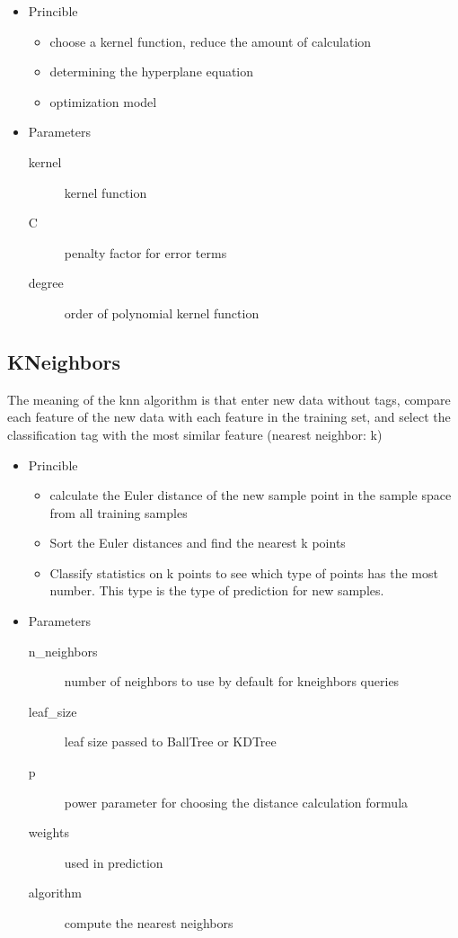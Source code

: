 \begin{itemize}
	\item Princible
	
	\begin{itemize}
		\item choose a kernel function, reduce the amount of calculation
		\item determining the hyperplane equation
		\item optimization model
	\end{itemize}

	\item Parameters
	
	\begin{description}
		\item[kernel] kernel function
		\item[C] penalty factor for error terms
		\item[degree] order of polynomial kernel function
	\end{description}
	
\end{itemize}

\subsection{KNeighbors}

The meaning of the knn algorithm is that 
enter new data without tags, 
compare each feature of the new data with 
each feature in the training set, 
and select the classification tag with 
the most similar feature (nearest neighbor: k)

\begin{itemize}
	\item Princible
	\begin{itemize}
		\item calculate the Euler distance of 
		the new sample point in the sample space 
		from all training samples
		\item Sort the Euler distances and 
		find the nearest k points
		\item Classify statistics on k points to 
		see which type of points has 
		the most number. 
		This type is the type of 
		prediction for new samples.
	\end{itemize}
	
	\item Parameters
	\begin{description}
		\item[n_neighbors] number of neighbors to use 
		by default for kneighbors queries
		\item[leaf_size] leaf size passed to BallTree or KDTree
		\item[p] power parameter for choosing 
		the distance calculation formula
		\item[weights] used in prediction
		\item[algorithm] compute the nearest neighbors
	\end{description}
	
\end{itemize}

